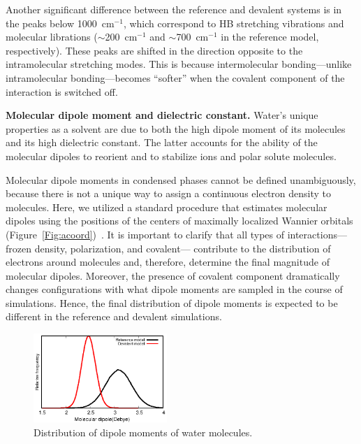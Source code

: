 \documentclass[10pt,amsmath,twocolumn,aps,prl,superscriptaddress,floatfix]{revtex4-1}
\begin{document}
Another significant difference between the reference and devalent systems is in the peaks below 1000~cm$^{-1}$, which correspond to HB stretching vibrations and molecular librations ($\sim$200~cm$^{-1}$ and $\sim$700~cm$^{-1}$ in the reference model, respectively). These peaks are shifted in the direction opposite to the intramolecular stretching modes. This is because intermolecular bonding---unlike intramolecular bonding---becomes ``softer'' when the covalent component of the interaction is switched off.%

\textbf{Molecular dipole moment and dielectric constant.} Water's unique properties as a solvent are due to both the high dipole moment of its molecules and its high dielectric constant. 
The latter accounts for the ability of the molecular dipoles to reorient and to stabilize ions and polar solute molecules. 

Molecular dipole moments in condensed phases cannot be defined unambiguously, because there is not a unique way to assign a continuous electron density to molecules.
Here, we utilized a standard procedure that estimates molecular dipoles using the positions of the centers of maximally localized Wannier orbitals (Figure~\ref{Fig:acoord})~\cite{marzari1997maximally,sharma2007dipolar}. 
It is important to clarify that all types of interactions---frozen density, polarization, and covalent--- contribute to the distribution of electrons around molecules and, therefore, determine the final magnitude of molecular dipoles. 
Moreover, the presence of covalent component dramatically changes configurations with what dipole moments are sampled in the course of simulations. 
Hence, the final distribution of dipole moments is expected to be different in the reference and devalent simulations. 

\begin{figure}[ht]
\includegraphics[width=0.45\textwidth]{new_dipole}
\caption{Distribution of dipole moments of water molecules.} \label{Fig:dipoledist}
\end{figure}
\end{document}
